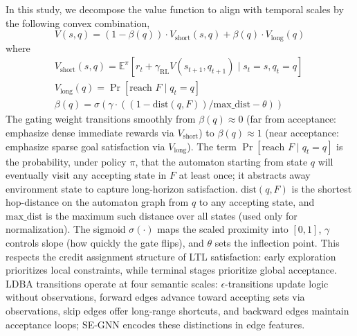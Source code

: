 \documentclass{article}
\begin{document}
In this study, we decompose the value function to align with temporal scales by the following convex combination,
\begin{equation}
V(s, q) = (1 - \beta(q)) \cdot V_{\text{short}}(s, q) + \beta(q) \cdot V_{\text{long}}(q)
\label{eq:decomposition}
\end{equation}
where 
\begin{equation*}
    \begin{aligned}
&V_{\text{short}}(s, q) = \mathbb{E}^\pi[r_t + \gamma_{\text{RL}} V(s_{t+1}, q_{t+1}) \mid s_t = s, q_t = q] \quad  \\
&V_{\text{long}}(q) = \Pr[\text{reach } F \mid q_t = q] \\
&\beta(q) = \sigma\left(\gamma \cdot \left(({1 - \text{dist}(q, F)})/{\text{max\_dist}} - \theta\right)\right) %
    \end{aligned}
\end{equation*}
The gating weight transitions smoothly from $\beta(q) \approx 0$ (far from acceptance: emphasize dense immediate rewards via $V_{\text{short}}$) to $\beta(q) \approx 1$ (near acceptance: emphasize sparse goal satisfaction via $V_{\text{long}}$). The term $\Pr[\text{reach } F \mid q_t = q]$ is the probability, under policy $\pi$, that the automaton starting from state $q$ will eventually visit any accepting state in $F$ at least once; it abstracts away environment state to capture long-horizon satisfaction. $\text{dist}(q, F)$ is the shortest hop-distance on the automaton graph from $q$ to any accepting state, and $\text{max\_dist}$ is the maximum such distance over all states (used only for normalization). The sigmoid $\sigma(\cdot)$ maps the scaled proximity into $[0,1]$, $\gamma$ controls slope (how quickly the gate flips), and $\theta$ sets the inflection point. This respects the credit assignment structure of LTL satisfaction: early exploration prioritizes local constraints, while terminal stages prioritize global acceptance. LDBA transitions operate at four semantic scales: $\epsilon$-transitions update logic without observations, forward edges advance toward accepting sets via observations, skip edges offer long-range shortcuts, and backward edges maintain acceptance loops; SE-GNN encodes these distinctions in edge features.
\end{document}
